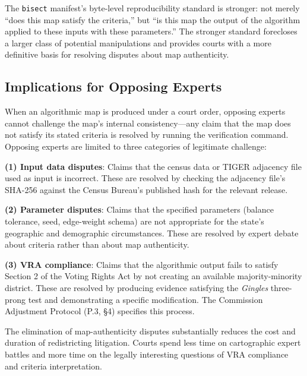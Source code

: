 The \texttt{bisect} manifest's byte-level reproducibility standard is stronger: not merely ``does this map satisfy the criteria,'' but ``is this map the output of the algorithm applied to these inputs with these parameters.'' The stronger standard forecloses a larger class of potential manipulations and provides courts with a more definitive basis for resolving disputes about map authenticity.

\subsection{Implications for Opposing Experts}

When an algorithmic map is produced under a court order, opposing experts cannot challenge the map's internal consistency---any claim that the map does not satisfy its stated criteria is resolved by running the verification command. Opposing experts are limited to three categories of legitimate challenge:

\textbf{(1) Input data disputes}: Claims that the census data or TIGER adjacency file used as input is incorrect. These are resolved by checking the adjacency file's SHA-256 against the Census Bureau's published hash for the relevant release.

\textbf{(2) Parameter disputes}: Claims that the specified parameters (balance tolerance, seed, edge-weight schema) are not appropriate for the state's geographic and demographic circumstances. These are resolved by expert debate about criteria rather than about map authenticity.

\textbf{(3) VRA compliance}: Claims that the algorithmic output fails to satisfy Section 2 of the Voting Rights Act by not creating an available majority-minority district. These are resolved by producing evidence satisfying the \textit{Gingles} three-prong test and demonstrating a specific modification. The Commission Adjustment Protocol (P.3, \S4) specifies this process.

The elimination of map-authenticity disputes substantially reduces the cost and duration of redistricting litigation. Courts spend less time on cartographic expert battles and more time on the legally interesting questions of VRA compliance and criteria interpretation.
